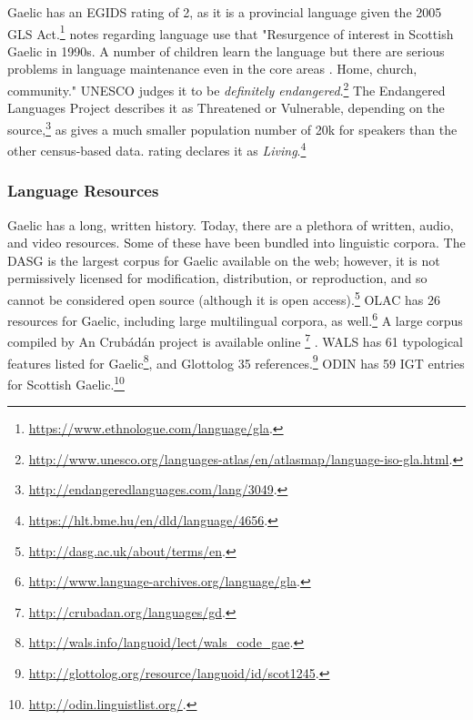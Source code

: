 Gaelic has an EGIDS rating of 2, as it is a provincial language given the 2005 GLS Act.\footnote{\href{https://www.ethnologue.com/language/gla}{https://www.ethnologue.com/language/gla}. }  \citet{lewis2009ethnologue} notes regarding language use that "Resurgence of interest in Scottish Gaelic in 1990s. A number of children learn the language but there are serious problems in language maintenance even in the core areas \citep{salminen2007endangered}. Home, church, community." UNESCO judges it to be {\it definitely endangered}.\footnote{\href{http://www.unesco.org/languages-atlas/en/atlasmap/language-iso-gla.html}{http://www.unesco.org/languages-atlas/en/atlasmap/language-iso-gla.html}. } The Endangered Languages Project describes it as Threatened or Vulnerable, depending on the source,\footnote{\href{http://endangeredlanguages.com/lang/3049}{http://endangeredlanguages.com/lang/3049}. } as \citet{salminen2007europe} gives a much smaller population number of 20k for speakers than the other census-based data.  rating declares it as {\it Living}.\footnote{\href{https://hlt.bme.hu/en/dld/language/4656}{https://hlt.bme.hu/en/dld/language/4656}. }

\subsubsection{Language Resources}
\label{subsec:gaelic-resources}

Gaelic has a long, written history. Today, there are a plethora of written, audio, and video resources. Some of these have been bundled into linguistic corpora. The DASG is the largest corpus for Gaelic available on the web; however, it is not permissively licensed for modification, distribution, or reproduction, and so cannot be considered open source (although it is open access).\footnote{\href{http://dasg.ac.uk/about/terms/en}{http://dasg.ac.uk/about/terms/en}. } OLAC has 26 resources for Gaelic, including large multilingual corpora, as well.\footnote{\href{http://www.language-archives.org/language/gla}{http://www.language-archives.org/language/gla}. } A large corpus compiled by An Crub\'ad\'an project is available online \footnote{\href{http://crubadan.org/languages/gd}{http://crubadan.org/languages/gd}. } \citep{scannell2007crubadan}. WALS has 61 typological features listed for Gaelic\footnote{\href{http://wals.info/languoid/lect/wals_code_gae}{http://wals.info/languoid/lect/wals\_code\_gae}. }, and Glottolog 35 references.\footnote{\href{http://glottolog.org/resource/languoid/id/scot1245}{http://glottolog.org/resource/languoid/id/scot1245}. } ODIN has 59 IGT entries for Scottish Gaelic.\footnote{\href{http://odin.linguistlist.org/}{http://odin.linguistlist.org/}. }

